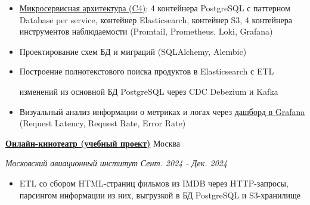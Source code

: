 \documentclass[14pt, a4paper, oneside]{extarticle}
\begin{document}
\begin{itemize}
	\vspace{-2\intextsep}
	\item \href{https://github.com/Crazy5202/job_application_form/tree/main/portfolio/eComm_C4.pdf}{Микросервисная архитектура (C4)}: 4 контейнера PostgreSQL с паттерном Database per service, контейнер Elasticsearch, контейнер S3, 4 контейнера инструментов наблюдаемости (Promtail, Prometheus, Loki, Grafana) 
	\vspace{-0.8\intextsep}
	\item Проектирование схем БД и миграций (SQLAlchemy, Alembic)
	\vspace{-0.8\intextsep}
	\item Построение полнотекстового поиска продуктов в Elasticsearch с ETL
	
	\vspace{-0.5\intextsep} 
	изменений из основной БД PostgreSQL через CDC Debezium и Kafka
	\vspace{-0.8\intextsep}
	\item Визуальный анализ информации о метриках и логах через \href{https://github.com/Crazy5202/job_application_form/tree/main/portfolio/eComm_Grafana.pdf}{дашборд в Grafana} (Request Latency, Request Rate, Error Rate)
\end{itemize}


\begin{flushleft}
	\vspace{-\intextsep}
	\quad
	\href{https://github.com/Crazy5202/Python_project}{\textbf{Онлайн-кинотеатр (учебный проект)}}
	\hfill
	Москва
\end{flushleft}

\begin{flushleft}
	\vspace{-1\intextsep}
	\quad
	\textit{Московский авиационный институт}
	\hfill
	\textit{\small Сент. 2024 - Дек. 2024}
\end{flushleft}


\begin{itemize}
	\vspace{-2\intextsep}
	\item ETL со сбором HTML-страниц фильмов из IMDB через HTTP-запросы,
    парсингом информации из них, выгрузкой в БД PostgreSQL и S3-хранилище
\end{itemize}

\end{document}
